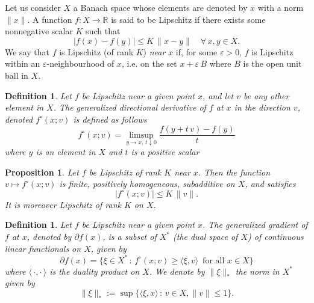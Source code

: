 \documentclass[12pt]{amsart}
\numberwithin{equation}{section}
\newtheorem{proposition}[theorem]{Proposition}
\newtheorem{definition}[theorem]{Definition}
\begin{document}
Let us consider $X$ a Banach space whose elements are denoted by $x$ with a norm $\|x\|$. A function $f:X\to \mathbb{R}$ is said to be Lipschitz if there exists some nonnegative scalar $K$ such that 
\begin{equation*}
    |f(x) - f(y)| \leq K\, \|x-y\| \quad \forall\, x,y\in X.
\end{equation*}
We say that $f$ is Lipschitz (of rank $K$) \textit{near} $x$ if, for some $\varepsilon>0$, $f$ is Lipschitz within an $\varepsilon$-neighbourhood of $x$, i.e. on the set $x+\varepsilon\,B$ where $B$ is the open unit ball in $X$.

\begin{definition}
Let $f$ be Lipschitz near a given point $x$, and let $v$ be any other element in $X$. The generalized directional derivative of $f$ at $x$ in the direction $v$, denoted $f^{\circ}(x;v)$ is defined as follows
\begin{equation*}
    f^{\circ}(x;v) = \limsup\limits_{y\to x,\, t\downarrow 0} \frac{f(y + t\,v) - f(y)}{t}
\end{equation*}
where $y$ is an element in $X$ and $t$ is a positive scalar
\end{definition}

\begin{proposition}
Let $f$ be Lipschitz of rank $K$ near $x$. Then the function $v\mapsto f^{\circ}(x;v)$ is finite, positively homogeneous,  subadditive on $X$, and satisfies
\begin{equation*}
    |f^{\circ}(x;v)| \leq K\,\|v\|.
\end{equation*}
It is moreover Lipschitz of rank $K$ on $X$.
\end{proposition}

\begin{definition}\label{def: general grad}
Let $f$ be Lipschitz near a given point $x$. The generalized gradient of $f$ at $x$, denoted by $\partial f(x)$, is a subset of $X^{*}$ (the dual space of $X$) of continuous linear functionals on $X$, given by
\begin{equation*}
    \partial f(x) = \{\xi\in X^{*}\,:\, f^{\circ}(x;v) \geq \langle \xi,v \rangle \, \text{ for all } x\in X\}
\end{equation*}
where $\langle\,\cdot,\cdot\,\rangle$ is the duality product on $X$. We denote by $\|\xi\|_{*}$ the norm in $X^{*}$ given by
\begin{equation*}
    \|\xi\|_{*} := \sup\{\langle \xi, x\rangle\,:\, v\in X, \|v\|\leq 1\}.
\end{equation*}
\end{definition}
\end{document}
